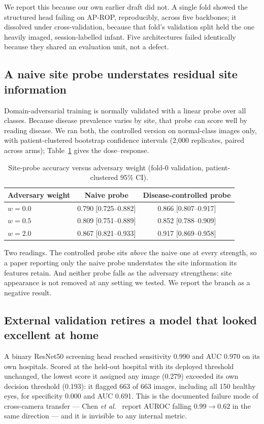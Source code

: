 \documentclass{article}
\begin{document}
We report this because our own earlier draft did not. A single fold showed the
structured head failing on AP-ROP, reproducibly, across five backbones; it
dissolved under cross-validation, because that fold's validation split held the
one heavily imaged, session-labelled infant. Five architectures failed
identically because they shared an evaluation unit, not a defect.

\subsection{A naive site probe understates residual site information}
\label{sec:probe}
Domain-adversarial training is normally validated with a linear probe over all
classes. Because disease prevalence varies by site, that probe can score well by
reading disease. We ran both, the controlled version on normal-class images only,
with patient-clustered bootstrap confidence intervals (2{,}000 replicates, paired
across arms); Table~\ref{tab:probe} gives the dose--response.

\begin{table}[b]
  \centering
  \caption{Site-probe accuracy versus adversary weight (fold-0 validation,
  patient-clustered 95\% CI).}
  \label{tab:probe}
  \begin{tabular}{lcc}
    \toprule
    Adversary weight & Naive probe & Disease-controlled probe \\
    \midrule
    $w = 0.0$ & 0.790 [0.725--0.882] & 0.866 [0.807--0.917] \\
    $w = 0.5$ & 0.809 [0.751--0.889] & 0.852 [0.788--0.909] \\
    $w = 2.0$ & 0.867 [0.821--0.933] & 0.917 [0.869--0.958] \\
    \bottomrule
  \end{tabular}
\end{table}

Two readings. The controlled probe sits \emph{above} the naive one at every
strength, so a paper reporting only the naive probe understates the site
information its features retain. And neither probe falls as the adversary
strengthens: site appearance is not removed at any setting we tested. We report
the branch as a negative result.

\subsection{External validation retires a model that looked excellent at home}
A binary ResNet50 screening head reached sensitivity 0.990 and AUC 0.970 on its
own hospitals. Scored at the held-out hospital with its deployed threshold
unchanged, the lowest score it assigned any image (0.279) exceeded its own
decision threshold (0.193): it flagged 663 of 663 images, including all 150
healthy eyes, for specificity 0.000 and AUC 0.691. This is the documented failure
mode of cross-camera transfer --- Chen \emph{et al.}~\cite{chen2021} report AUROC
falling $0.99 \rightarrow 0.62$ in the same direction --- and it is invisible to
any internal metric.
\end{document}
